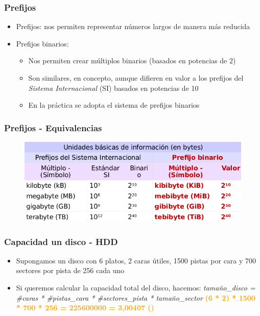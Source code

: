 \begin{frame}
  \frametitle{Prefijos}
  \begin{itemize}
    \item Prefijos: nos permiten representar números largos de manera más reducida
    \item Prefijos binarios: 
    \begin{itemize}
      \item Nos permiten crear múltiplos binarios (basados en potencias de 2)
      \item Son similares, en concepto, aunque difieren en valor a los prefijos del \emph{Sistema Internacional} (SI) basados en potencias de 10
      \item En la práctica se adopta el sistema de prefijos binarios
    \end{itemize}  
  \end{itemize}
\end{frame}

\begin{frame}
  \frametitle{Prefijos - \textbf{Equivalencias}}
  \begin{figure}
      \includegraphics[scale=0.5]{images/si.png}
  \end{figure}
\end{frame}

\begin{frame}
  \frametitle{Capacidad un disco - \textbf{HDD}}
  \begin{itemize}
    \item Supongamos un disco con 6 platos, 2 caras útiles, 1500 pistas por cara y 700 sectores por pista de 256 \bytes cada uno
    \item Si queremos calcular la capacidad total del disco, hacemos:
    \linebreak
    \linebreak
    \emph{tamaño\_disco = \#caras * \#pistas\_cara * \#sectores\_pista * tamaño\_sector}
    \linebreak
    \linebreak
    \textcolor{orange}{\textbf{(6 * 2) * 1500 * 700 * 256 \bytes = 225600000 \bytes = 3,00407 \gibishort\bytesshort (\gibi\bytes)}}
  \end{itemize}
\end{frame}

